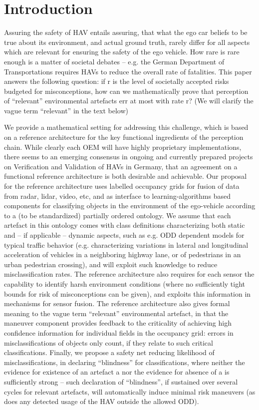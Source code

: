 \section{Introduction}
Assuring the safety of HAV entails assuring, that what the ego car beliefs to be true about its environment, and actual ground truth, rarely differ for all aspects which are relevant for ensuring the safety of the ego vehicle. How rare is rare enough is a matter of societal debates -- e.g. the German Department of Transportations requires HAVs to reduce the overall rate of fatalities. This paper answers the following question: if  r  is the level of societally accepted risks budgeted for misconceptions, how can we mathematically prove that perception of \enquote{relevant} environmental artefacts err at most with rate r? (We will clarify the vague term \enquote{relevant} in the text below)

We provide a mathematical setting for addressing this challenge, which is based on a reference architecture for the key functional ingredients of the perception chain. While clearly each OEM will have highly proprietary implementations, there seems to an emerging consensus in ongoing and currently prepared projects on Verification and Validation of HAVs in Germany, that an agreement on a functional reference architecture is both desirable and achievable. Our proposal for the reference architecture uses labelled occupancy grids for fusion of data from radar, lidar, video, etc, and as interface to learning-algorithms based components for classifying objects in the environment of the ego-vehicle according to a (to be standardized) partially ordered ontology. We assume that each artefact in this ontology comes with class definitions characterizing both static and – if applicable – dynamic aspects, such as e.g. ODD dependent models for typical traffic behavior (e.g. characterizing variations in lateral and longitudinal acceleration of vehicles in a neighboring highway lane, or of pedestrians in an urban pedestrian crossing), and will exploit such knowledge to reduce misclassification rates. The reference architecture also requires for each sensor the capability to identify harsh environment conditions (where no sufficiently tight bounds for risk of misconceptions can be given), and exploits this information in mechanisms for sensor fusion. The reference architecture also gives formal meaning to the vague term \enquote{relevant} environmental artefact, in that the maneuver component provides feedback to the criticality of achieving high confidence information for individual fields in the occupancy grid: errors in misclassifications of objects only count, if they relate to such critical classifications. Finally, we propose a safety net reducing likelihood of misclassifications, in declaring \enquote{blindness} for classifications, where neither the evidence for existence of an artefact a nor the evidence for absence of a is sufficiently strong – such declaration of \enquote{blindness}, if sustained over several cycles for relevant artefacts, will automatically induce minimal risk maneuvers (as does any detected usage of the HAV outside the allowed ODD).

